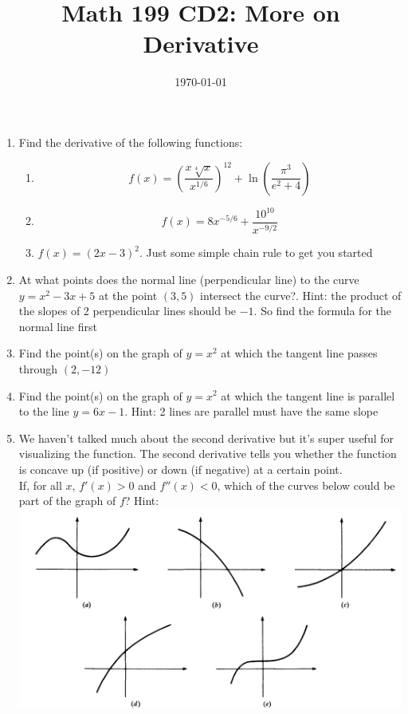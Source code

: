 \documentclass[12pt]{article}
\title{Math 199 CD2: More on Derivative}
\date{\today}
\begin{document}
	
	\maketitle
	
	\begin{enumerate}
		\item Find the derivative of the following functions: 
		\begin{enumerate}
			\item $$f(x)=\left(\frac{x \sqrt[4] x}{x^{1/6}}\right)^{12}+\ln\left(\frac{\pi^3}{e^2+4}\right)$$
			
			\vskip 4cm
			
			\item $$f(x)=8x^{-5/6}+\frac{10^{10}}{x^{-9/2}}$$
			
			\vskip 4cm
			\item $f(x) = (2x -3)^2$. Just some simple chain rule to get you started
		\end{enumerate}
	\newpage
	
		\item At what points does the normal line (perpendicular line) to the curve $y = x^2 - 3x + 5$ at the point $(3, 5)$ 	intersect the curve?. Hint: the product of the slopes of 2 perpendicular lines should be $-1$. So find the formula for the normal line first  \\
		
		\vskip 7cm
		\item Find the point(s) on the graph of $y = x^2$ at which the tangent line passes through $(2, -12)$
		
		\vskip 7cm
		
		\item Find the point(s) on the graph of $y = x^2$ at which the tangent line is parallel to the line $y= 6x -1$. Hint: 2 lines are parallel must have the same slope
		
		\vskip 7cm
		
		\item We haven't talked much about the second derivative but it's super useful for visualizing the function. The second derivative tells you whether the function is concave up (if positive) or down (if negative) at a certain point.\\ 
		If, for all $x$, $f'(x)>0$ and $f''(x)<0$, which of the curves below could be part of the graph of $f$? Hint: \\
		
		\includegraphics[scale=0.6]{p6.png}
	\end{enumerate}
	
	
	

	
\end{document}
